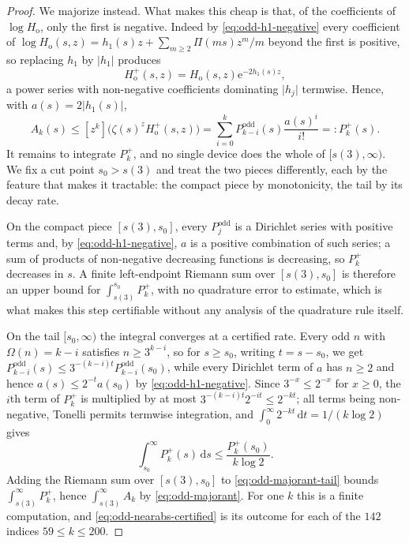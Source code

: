 \documentclass[11pt]{amsart}
\theoremstyle{plain}
\theoremstyle{definition}
\newcommand{\e}{\mathrm e}
\newcommand{\dd}{\,\mathrm d}
\newcommand{\abs}[1]{\lvert #1\rvert}
\begin{document}
\begin{proof}
We majorize instead. What makes this cheap is that, of the coefficients of
$\log H_{\mathrm o}$, only the first is negative. Indeed by
\eqref{eq:odd-h1-negative} every coefficient of
$\log H_{\mathrm o}(s,z)=h_1(s)z+\sum_{m\geq2}\Pi(ms)z^m/m$ beyond the first
is positive, so replacing $h_1$ by $\abs{h_1}$ produces
\[
 H_{\mathrm o}^+(s,z)=H_{\mathrm o}(s,z)\e^{-2h_1(s)z},
\]
a power series with non-negative coefficients dominating $\abs{h_j}$
termwise. Hence, with $a(s)=2\abs{h_1(s)}$,
\begin{equation}\label{eq:odd-majorant}
 A_k(s)\leq[z^k]\bigl(\zeta(s)^zH_{\mathrm o}^+(s,z)\bigr)
 =\sum_{i=0}^kP_{k-i}^{\mathrm{odd}}(s)\frac{a(s)^i}{i!}=:P_k^+(s).
\end{equation}
It remains to integrate $P_k^+$, and no single device does the whole of
$[s(3),\infty)$. We fix a cut point $s_0>s(3)$ and treat the two pieces
differently, each by the feature that makes it tractable: the compact piece by
monotonicity, the tail by its decay rate.

On the compact piece $[s(3),s_0]$, every $P_j^{\mathrm{odd}}$ is a Dirichlet
series with positive terms and, by \eqref{eq:odd-h1-negative}, $a$ is a
positive combination of such series; a sum of products of non-negative
decreasing functions is decreasing, so $P_k^+$ decreases in $s$. A finite
left-endpoint Riemann sum over $[s(3),s_0]$ is therefore an upper bound for
$\int_{s(3)}^{s_0}P_k^+$, with no quadrature error to estimate, which is
what makes this step certifiable without any analysis of the quadrature rule
itself.

On the tail $[s_0,\infty)$ the integral converges at a certified rate. Every
odd $n$ with $\Omega(n)=k-i$ satisfies $n\geq3^{k-i}$, so for $s\geq s_0$,
writing $t=s-s_0$, we get
$P_{k-i}^{\mathrm{odd}}(s)\leq3^{-(k-i)t}P_{k-i}^{\mathrm{odd}}(s_0)$, while
every Dirichlet term of $a$ has $n\geq2$ and hence
$a(s)\leq2^{-t}a(s_0)$ by \eqref{eq:odd-h1-negative}. Since
$3^{-x}\leq2^{-x}$ for $x\geq0$, the $i$th term of $P_k^+$ is multiplied by at
most $3^{-(k-i)t}2^{-it}\leq2^{-kt}$; all terms being non-negative, Tonelli
permits termwise integration, and $\int_0^\infty2^{-kt}\dd t=1/(k\log2)$ gives
\begin{equation}\label{eq:odd-majorant-tail}
 \int_{s_0}^\infty P_k^+(s)\dd s\leq\frac{P_k^+(s_0)}{k\log2}.
\end{equation}
Adding the Riemann sum over $[s(3),s_0]$ to \eqref{eq:odd-majorant-tail}
bounds $\int_{s(3)}^\infty P_k^+$, hence $\int_{s(3)}^\infty A_k$ by
\eqref{eq:odd-majorant}. For one $k$ this is a finite computation, and
\eqref{eq:odd-nearabs-certified} is its outcome for each of the $142$ indices
$59\leq k\leq200$.


\end{proof}
\end{document}

